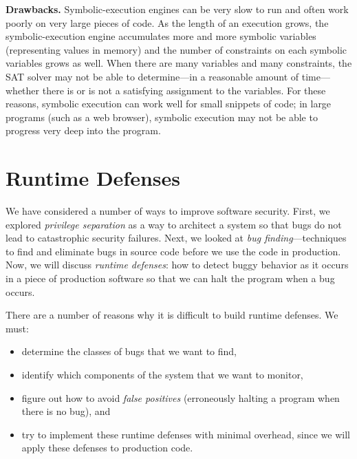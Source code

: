 \documentclass[
  letterpaper,
]{scrbook}
\providecommand{\tightlist}{%
  \setlength{\itemsep}{0pt}\setlength{\parskip}{0pt}}
\theoremstyle{definition}
\theoremstyle{plain}
\theoremstyle{plain}
\theoremstyle{remark}
\begin{document}
\textbf{Drawbacks.} Symbolic-execution engines can be very slow to run
and often work poorly on very large pieces of code. As the length of an
execution grows, the symbolic-execution engine accumulates more and more
symbolic variables (representing values in memory) and the number of
constraints on each symbolic variables grows as well. When there are
many variables and many constraints, the SAT solver may not be able to
determine---in a reasonable amount of time---whether there is or is not
a satisfying assignment to the variables. For these reasons, symbolic
execution can work well for small snippets of code; in large programs
(such as a web browser), symbolic execution may not be able to progress
very deep into the program.


\chapter{Runtime Defenses}\label{runtime-defenses}

We have considered a number of ways to improve software security. First,
we explored \emph{privilege separation} as a way to architect a system
so that bugs do not lead to catastrophic security failures. Next, we
looked at \emph{bug finding}---techniques to find and eliminate bugs in
source code before we use the code in production. Now, we will discuss
\emph{runtime defenses}: how to detect buggy behavior as it occurs in a
piece of production software so that we can halt the program when a bug
occurs.

There are a number of reasons why it is difficult to build runtime
defenses. We must:

\begin{itemize}
\tightlist
\item
  determine the classes of bugs that we want to find,
\item
  identify which components of the system that we want to monitor,
\item
  figure out how to avoid \emph{false positives} (erroneously halting a
  program when there is no bug), and
\item
  try to implement these runtime defenses with minimal overhead, since
  we will apply these defenses to production code.
\end{itemize}
\end{document}
